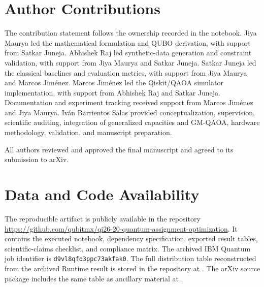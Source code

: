 \documentclass[11pt,a4paper]{article}
\newcommand{\QAOA}{\textsc{QAOA}}
\newcommand{\GMQAOA}{\textsc{GM-QAOA}}
\newcommand{\QUBO}{\textsc{QUBO}}
\begin{document}
\clearpage
\tableofcontents
\listoffigures
\listoftables
\clearpage












\section*{Author Contributions}
The contribution statement follows the ownership recorded in the notebook. Jiya Maurya led the mathematical formulation and \QUBO{} derivation, with support from Satkar Juneja. Abhishek Raj led synthetic-data generation and constraint validation, with support from Jiya Maurya and Satkar Juneja. Satkar Juneja led the classical baselines and evaluation metrics, with support from Jiya Maurya and Marcos Jiménez. Marcos Jiménez led the Qiskit/\QAOA{} simulator implementation, with support from Abhishek Raj and Satkar Juneja. Documentation and experiment tracking received support from Marcos Jiménez and Jiya Maurya. Iván Barrientos Salas provided conceptualization, supervision, scientific auditing, integration of generalized capacities and \GMQAOA{}, hardware methodology, validation, and manuscript preparation.

All authors reviewed and approved the final manuscript and agreed to its
submission to arXiv.

\section*{Data and Code Availability}
The reproducible artifact is publicly available in the repository
\url{https://github.com/qubitmx/qi26-20-quantum-assignment-optimization}.
It contains the executed notebook, dependency specification, exported result tables, scientific-claims checklist, and compliance matrix. The archived IBM Quantum job identifier is \texttt{d9vl8qfo3ppc73akfak0}. The full distribution table reconstructed from the archived Runtime result is stored in the repository at . The arXiv source package includes the same table as ancillary material at .
\end{document}
